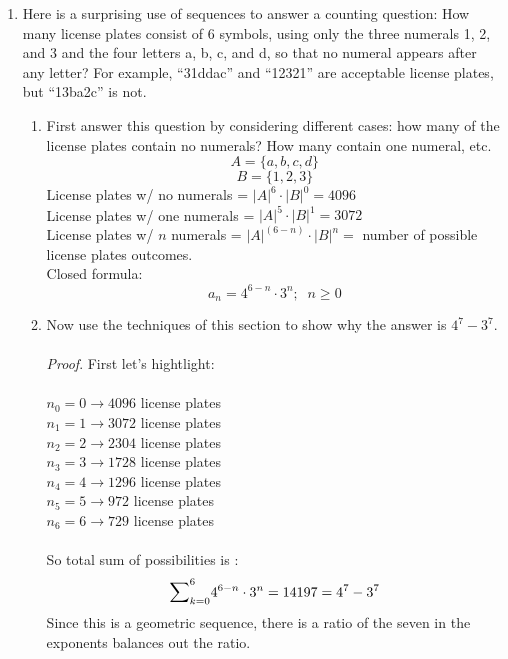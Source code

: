 \documentclass[11pt,a4paper]{article}
\newcommand\setItemNumber[1]{\setcounter{enumi}{\numexpr#1-1\relax}}
\begin{document}
\begin{enumerate}
            \setItemNumber{15}
            \item Here is a surprising use of sequences to answer a counting question: How many license plates consist of 6 symbols, using only the three numerals 1, 2, and 3 and the four letters a, b, c, and d, so that no numeral appears after any letter? For example, “31ddac” and “12321” are acceptable license plates, but “13ba2c” is not.
                \begin{enumerate}
                    \item First answer this question by considering different cases: how many of the license plates contain no numerals? How many contain one numeral, etc.
                        $$A = \{a, b, c, d\}$$
                        $$B = \{1, 2, 3 \}$$
                        License plates w/ no numerals = $|A|^6\cdot |B|^0 = 4096$\\
                        License plates w/ one numerals = $|A|^5\cdot |B|^1 = 3072$\\
                        License plates w/ $n$ numerals = $|A|^{(6 - n)} \cdot |B|^{n} =$ number of possible license plates outcomes.\\
                        Closed formula:\\
                        $$ a_n = 4^{6-n}\cdot 3^{n};\;\;n\geq 0$$ 
                    \item Now use the techniques of this section to show why the answer is $4^7 - 3^7$.\\\\

                        \textit{Proof}. First let's hightlight:\\\\
                        $n_0 = 0 \rightarrow 4096$ license plates\\
                        $n_1 = 1 \rightarrow 3072$ license plates\\
                        $n_2 = 2 \rightarrow 2304$ license plates\\
                        $n_3 = 3 \rightarrow 1728$ license plates\\
                        $n_4 = 4 \rightarrow 1296$ license plates\\
                        $n_5 = 5 \rightarrow 972$ license plates\\
                        $n_6 = 6 \rightarrow 729$ license plates\\\\
                        So total sum of possibilities is :\\
                        $${\mathlarger{\sum}}_{k=0}^{6}4^{6-n}\cdot 3^n = 14197 = 4^7 - 3^7$$
                        Since this is a geometric sequence, there is a ratio of the seven in the exponents balances out the ratio. 

                \end{enumerate}

        \end{enumerate}
	
	
		
\end{document}
